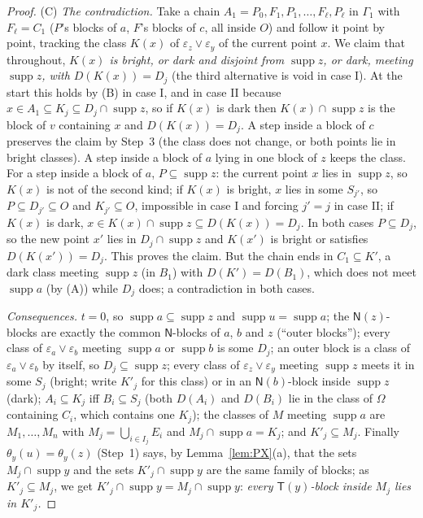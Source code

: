 \documentclass[11pt]{amsart}
\theoremstyle{definition}
\newcommand{\supp}{\operatorname{supp}}
\newcommand{\T}{\mathsf{T}}
\newcommand{\N}{\mathsf{N}}
\begin{document}
\begin{proof}
(C) \emph{The contradiction.} Take a chain $A_1=P_0,F_1,P_1,\dots,F_\ell,P_\ell$ in $\Gamma_1$ with $F_\ell=C_1$ ($P$'s blocks of $a$, $F$'s blocks of $c$, all inside $O$) and follow it point by point, tracking the class $K(x)$ of $\varepsilon_z\vee\varepsilon_y$ of the current point $x$. We claim that throughout, \emph{$K(x)$ is bright, or dark and disjoint from $\supp z$, or dark, meeting $\supp z$, with $D(K(x))=D_j$} (the third alternative is void in case I). At the start this holds by (B) in case I, and in case II because $x\in A_1\subseteq K_j\subseteq D_j\cap\supp z$, so if $K(x)$ is dark then $K(x)\cap\supp z$ is the block of $v$ containing $x$ and $D(K(x))=D_j$. A step inside a block of $c$ preserves the claim by Step~3 (the class does not change, or both points lie in bright classes). A step inside a block of $a$ lying in one block of $z$ keeps the class. For a step inside a block of $a$, $P\subseteq\supp z$: the current point $x$ lies in $\supp z$, so $K(x)$ is not of the second kind; if $K(x)$ is bright, $x$ lies in some $S_{j'}$, so $P\subseteq D_{j'}\subseteq O$ and $K_{j'}\subseteq O$, impossible in case I and forcing $j'=j$ in case II; if $K(x)$ is dark, $x\in K(x)\cap\supp z\subseteq D(K(x))=D_j$. In both cases $P\subseteq D_j$, so the new point $x'$ lies in $D_j\cap\supp z$ and $K(x')$ is bright or satisfies $D(K(x'))=D_j$. This proves the claim. But the chain ends in $C_1\subseteq K'$, a dark class meeting $\supp z$ (in $B_1$) with $D(K')=D(B_1)$, which does not meet $\supp a$ (by (A)) while $D_j$ does; a contradiction in both cases.

\emph{Consequences.} $t=0$, so $\supp a\subseteq\supp z$ and $\supp u=\supp a$; the $\N(z)$-blocks are exactly the common $\N$-blocks of $a$, $b$ and $z$ (``outer blocks''); every class of $\varepsilon_a\vee\varepsilon_b$ meeting $\supp a$ or $\supp b$ is some $D_j$; an outer block is a class of $\varepsilon_a\vee\varepsilon_b$ by itself, so $D_j\subseteq\supp z$; every class of $\varepsilon_z\vee\varepsilon_y$ meeting $\supp z$ meets it in some $S_j$ (bright; write $K'_j$ for this class) or in an $\N(b)$-block inside $\supp z$ (dark); $A_i\subseteq K_j$ iff $B_i\subseteq S_j$ (both $D(A_i)$ and $D(B_i)$ lie in the class of $\Omega$ containing $C_i$, which contains one $K_j$); the classes of $M$ meeting $\supp a$ are $M_1,\dots,M_n$ with $M_j=\bigcup_{i\in I_j}E_i$ and $M_j\cap\supp a=K_j$; and $K'_j\subseteq M_j$. Finally $\theta_y(u)=\theta_y(z)$ (Step~1) says, by Lemma~\ref{lem:PX}(a), that the sets $M_j\cap\supp y$ and the sets $K'_j\cap\supp y$ are the same family of blocks; as $K'_j\subseteq M_j$, we get $K'_j\cap\supp y=M_j\cap\supp y$: \emph{every $\T(y)$-block inside $M_j$ lies in $K'_j$.}


\end{proof}
\end{document}
